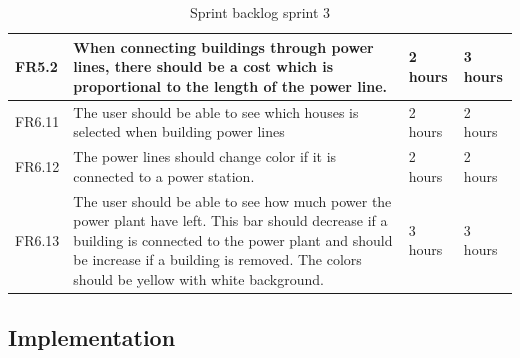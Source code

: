 \begin{table}[H]
\begin{tabular}{| p{1cm} | p{7cm} | p{2cm} | p{2cm} |}
		FR5.2 & When connecting buildings through power lines, there should be a 
		cost which is proportional to the length of the power line. 
		& 2 hours & 3 hours \\ \hline

		FR6.11 & The user should be able to see which houses is selected when 
		building power lines 
		& 2 hours & 2 hours \\ \hline

		FR6.12 & The power lines should change color if it is connected to a power 
		station. 
		& 2 hours & 2 hours \\ \hline

		FR6.13 & The user should be able to see how much power the power plant have 
		left. This bar should decrease if a building is connected to the power plant 
		and should be increase if a building is removed. The colors should be yellow 
		with white background. 
		& 3 hours & 3 hours \\ \hline

	\end{tabular}
	\caption{Sprint backlog sprint 3}
	\end{table}

\subsection{Implementation}
	

